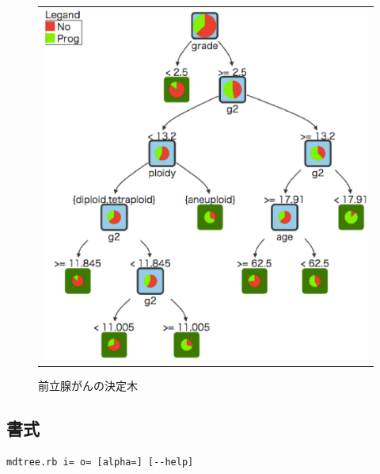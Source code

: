 \begin{figure}[htbp]
\begin{center}
\begin{tabular}{c}

\begin{minipage}{0.5\hsize}
\begin{center}
\includegraphics[scale=0.5]{figure/tree_4.eps}
\caption{前立腺がんの決定木\label{fig:mdtree_tree_4}}
\end{center}
\end{minipage}

\end{tabular}
\end{center}
\end{figure}



\subsection{書式}
\begin{verbatim}
mdtree.rb i= o= [alpha=] [--help]
\end{verbatim}

